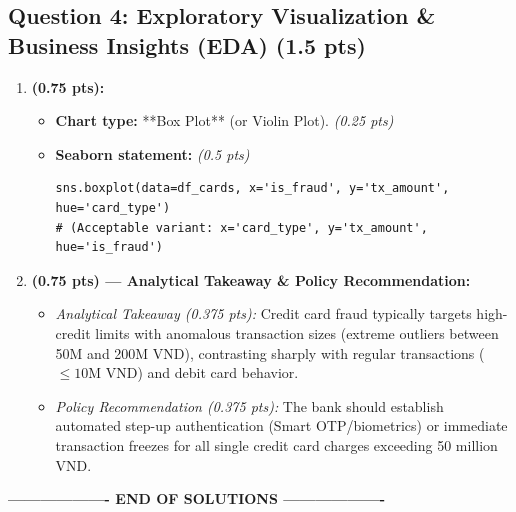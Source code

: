 \documentclass[11pt,a4paper]{article}
\begin{document}
\subsection*{Question 4: Exploratory Visualization \& Business Insights (EDA) (1.5 pts)}
\begin{enumerate}[label=\textbf{\alph*)}]
  \item \textbf{(0.75 pts):}
  \begin{itemize}
    \item \textbf{Chart type:} **Box Plot** (or Violin Plot). \textit{(0.25 pts)}
    \item \textbf{Seaborn statement:} \textit{(0.5 pts)}
\begin{lstlisting}
sns.boxplot(data=df_cards, x='is_fraud', y='tx_amount', hue='card_type')
# (Acceptable variant: x='card_type', y='tx_amount', hue='is_fraud')
\end{lstlisting}
  \end{itemize}

  \item \textbf{(0.75 pts) --- Analytical Takeaway \& Policy Recommendation:}
  \begin{itemize}
    \item \textit{Analytical Takeaway (0.375 pts):} Credit card fraud typically targets high-credit limits with anomalous transaction sizes (extreme outliers between 50M and 200M VND), contrasting sharply with regular transactions ($\le 10$M VND) and debit card behavior.
    \item \textit{Policy Recommendation (0.375 pts):} The bank should establish automated step-up authentication (Smart OTP/biometrics) or immediate transaction freezes for all single credit card charges exceeding 50 million VND.
  \end{itemize}
\end{enumerate}

\begin{center}
\textbf{------------------- END OF SOLUTIONS -------------------}
\end{center}
\end{document}
